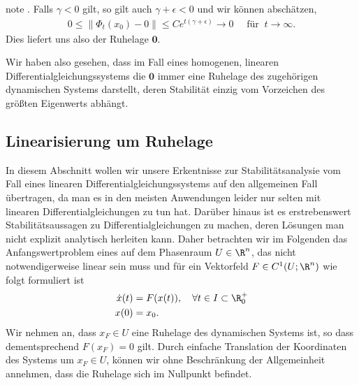 \documentclass[letterpaper,10pt,english]{jupyterBook}
\begin{document}
\begin{sphinxadmonition}{note}
. Falls \(\gamma <0\) gilt, so gilt auch \(\gamma + \epsilon <0\) und wir können abschätzen,
\begin{equation*}
\begin{split}0\leq \|\Phi_t(x_0)-0\|\leq C e^{t (\gamma + \epsilon)} \to 0 \quad \text{ für } \ t \to \infty.\end{split}
\end{equation*}
\sphinxAtStartPar
Dies liefert uns also  der Ruhelage \(\mathbf{0}\).
\end{sphinxadmonition}

\sphinxAtStartPar
Wir haben also gesehen, dass im Fall eines homogenen, linearen Differentialgleichungssystems die \(\mathbf{0}\) immer eine Ruhelage des zugehörigen dynamischen Systems darstellt, deren Stabilität einzig vom Vorzeichen des größten Eigenwerts abhängt.


\subsection{Linearisierung um Ruhelage}
\label{\detokenize{odestability/ruhelagen:linearisierung-um-ruhelage}}\label{\detokenize{odestability/ruhelagen:s-linearisierung-ruhelage}}
\sphinxAtStartPar
In diesem Abschnitt wollen wir unsere Erkentnisse zur Stabilitätsanalysie vom Fall eines linearen Differentialgleichungssystems auf den allgemeinen Fall übertragen, da man es in den meisten Anwendungen leider nur selten mit linearen Differentialgleichungen zu tun hat.
Darüber hinaus ist es erstrebenswert Stabilitätsaussagen zu Differentialgleichungen zu machen, deren Lösungen man nicht explizit analytisch herleiten kann.
Daher betrachten wir im Folgenden das Anfangswertproblem eines  auf dem Phasenraum \(U\in \R^n\), das nicht notwendigerweise linear sein muss und für ein Vektorfeld \(F\in C^1(U;\R^n)\) wie folgt formuliert ist
\begin{equation}\label{equation:odestability/ruhelagen:eq:awpallg}
\begin{split}\dot{x}(t) &= F(x(t)), \quad \forall t \in I \subset \R^+_0\\
x(0) &= x_0.\end{split}
\end{equation}
\sphinxAtStartPar
Wir nehmen an, dass \(x_F \in U\) eine Ruhelage des dynamischen Systems ist, so dass dementsprechend \(F(x_F) = 0\) gilt.
Durch einfache Translation der Koordinaten des Systems um \(x_F \in U\), können wir ohne Beschränkung der Allgemeinheit annehmen, dass die Ruhelage sich im Nullpunkt befindet.
\end{document}
